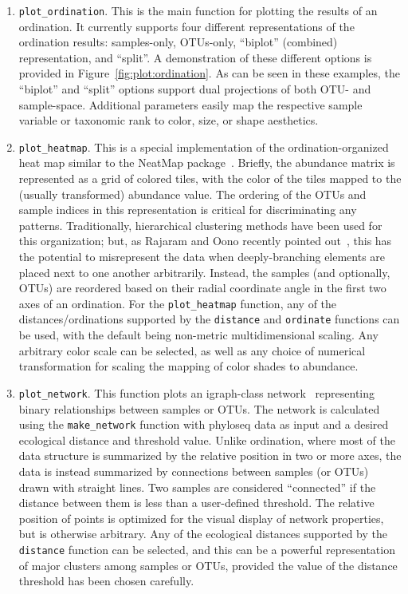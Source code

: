 \documentclass[10pt]{article}\usepackage{graphicx, color}
\newcommand{\code}[1]{{\texttt{#1}}}
\begin{document}
\begin{enumerate} 
\item \code{plot{\_}ordination}.
This is the main function for plotting the results of an ordination.
It currently supports four different representations of the ordination results:
samples-only,
OTUs-only,
``biplot'' (combined) representation,
and ``split''.
A demonstration of these different options
is provided in Figure~\ref{fig:plot:ordination}.
As can be seen in these examples,
the ``biplot'' and ``split'' options support dual projections
of both OTU- and sample-space.
Additional parameters easily map 
the respective sample variable or taxonomic rank
to color, size, or shape aesthetics.

\item \code{plot{\_}heatmap}.
This is a special implementation of the ordination-organized heat map
similar to the NeatMap package~\cite{neatmap}.
Briefly, the abundance matrix is represented as a grid of colored tiles,
with the color of the tiles mapped to the
(usually transformed) abundance value.
The ordering of the OTUs and sample indices in this representation
is critical for discriminating any patterns.
Traditionally, hierarchical clustering methods
have been used for this organization; 
but, as Rajaram and Oono recently pointed out~\cite{neatmap},
this has the potential to misrepresent the data
when deeply-branching elements are placed next to one another arbitrarily.
Instead, the samples (and optionally, OTUs) are reordered
based on their radial coordinate angle
in the first two axes of an ordination.
For the \code{plot{\_}heatmap} function,
any of the distances/ordinations supported by
the \code{distance} and \code{ordinate} functions
can be used,
with the default being non-metric multidimensional scaling.
Any arbitrary color scale can be selected,
as well as any choice of numerical transformation
for scaling the mapping of color shades to abundance.

\item \code{plot{\_}network}.
This function plots an igraph-class network~\cite{igraph}
representing binary relationships between samples or OTUs.
The network is calculated using the \code{make{\_}network} function
with phyloseq data as input and a desired ecological distance and threshold value.
Unlike ordination, where most of the data structure is summarized
by the relative position in two or more axes, 
the data is instead summarized by connections
between samples (or OTUs) drawn with straight lines.
Two samples are considered ``connected'' if the distance between them
is less than a user-defined threshold.
The relative position of points is optimized
for the visual display of network properties,
but is otherwise arbitrary.
Any of the ecological distances supported by the \code{distance} function
can be selected,
and this can be a powerful representation of major clusters among samples or OTUs,
provided the value of the distance threshold has been chosen carefully.


\end{enumerate}
\end{document}

